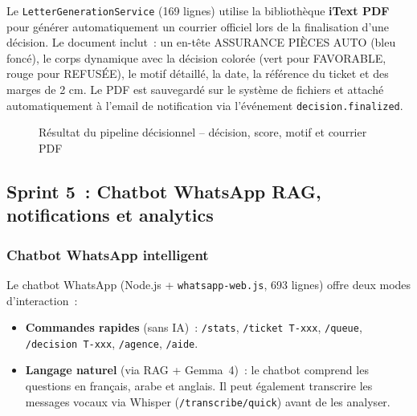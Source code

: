 Le \texttt{LetterGenerationService} (169 lignes) utilise la biblioth\`{e}que \textbf{iText PDF} pour g\'{e}n\'{e}rer automatiquement un courrier officiel lors de la finalisation d'une d\'{e}cision. Le document inclut~: un en-t\^{e}te \og ASSURANCE PI\`{E}CES AUTO \fg (bleu fonc\'{e}), le corps dynamique avec la d\'{e}cision color\'{e}e (vert pour FAVORABLE, rouge pour REFUS\'{E}E), le motif d\'{e}taill\'{e}, la date, la r\'{e}f\'{e}rence du ticket et des marges de 2 cm. Le PDF est sauvegard\'{e} sur le syst\`{e}me de fichiers et attach\'{e} automatiquement \`{a} l'email de notification via l'\'{e}v\'{e}nement \texttt{decision.finalized}.

\begin{figure}[H]
    \centering
    \caption{R\'{e}sultat du pipeline d\'{e}cisionnel -- d\'{e}cision, score, motif et courrier PDF}
    \label{fig:decision}
\end{figure}


\subsection{Sprint 5~: Chatbot WhatsApp RAG, notifications et analytics}

\subsubsection{Chatbot WhatsApp intelligent}

Le chatbot WhatsApp (Node.js + \texttt{whatsapp-web.js}, 693 lignes) offre deux modes d'interaction~:

\begin{itemize}
    \item \textbf{Commandes rapides} (sans IA)~: \texttt{/stats}, \texttt{/ticket T-xxx}, \texttt{/queue}, \texttt{/decision T-xxx}, \texttt{/agence}, \texttt{/aide}.
    \item \textbf{Langage naturel} (via RAG + Gemma~4)~: le chatbot comprend les questions en fran\c{c}ais, arabe et anglais. Il peut \'{e}galement transcrire les messages vocaux via Whisper (\texttt{/transcribe/quick}) avant de les analyser.
\end{itemize}


